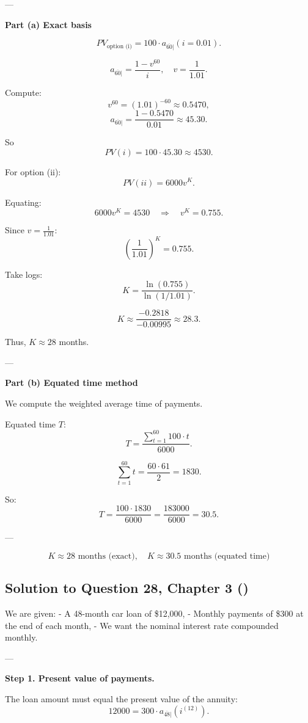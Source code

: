 \documentclass[12pt, a4paper]{article}
\begin{document}
---

\textbf{Part (a) Exact basis}

\[
PV_{\text{option (i)}} = 100 \cdot a_{\overline{60}|}(i=0.01).
\]

\[
a_{\overline{60}|} = \frac{1-v^{60}}{i}, 
\quad v=\frac{1}{1.01}.
\]

Compute:
\[
v^{60} = (1.01)^{-60} \approx 0.5470,
\]
\[
a_{\overline{60}|} = \frac{1-0.5470}{0.01} \approx 45.30.
\]

So
\[
PV(i) = 100 \cdot 45.30 \approx 4530.
\]

For option (ii):
\[
PV(ii) = 6000 v^K.
\]

Equating:
\[
6000 v^K = 4530 \quad \Rightarrow \quad v^K = 0.755.
\]

Since $v=\tfrac{1}{1.01}$:
\[
\left(\frac{1}{1.01}\right)^K = 0.755.
\]

Take logs:
\[
K = \frac{\ln(0.755)}{\ln(1/1.01)}.
\]

\[
K \approx \frac{-0.2818}{-0.00995} \approx 28.3.
\]

Thus, $K \approx 28$ months.

---

\textbf{Part (b) Equated time method}

We compute the weighted average time of payments.  

Equated time $T$:
\[
T = \frac{\sum_{t=1}^{60} 100 \cdot t}{6000}.
\]

\[
\sum_{t=1}^{60} t = \frac{60 \cdot 61}{2} = 1830.
\]

So:
\[
T = \frac{100 \cdot 1830}{6000} = \frac{183000}{6000} = 30.5.
\]

---

\[
\boxed{K \approx 28 \text{ months (exact)}, \quad K \approx 30.5 \text{ months (equated time)}}
\]

\subsection*{Solution to Question 28, Chapter 3 (\cite{toi3rd})}

We are given:  
- A 48-month car loan of \$12{,}000,  
- Monthly payments of \$300 at the end of each month,  
- We want the nominal interest rate compounded monthly.

---

\textbf{Step 1. Present value of payments.}

The loan amount must equal the present value of the annuity:
\[
12000 = 300 \cdot a_{\overline{48}|}(i^{(12)}).
\]
\end{document}
